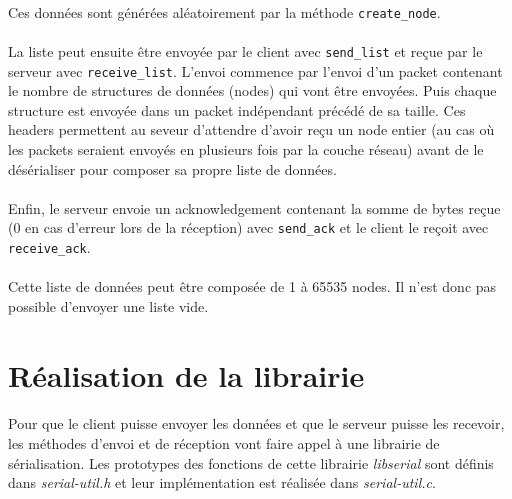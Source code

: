 \documentclass{article}
\begin{document}
    \newpage
    \paragraph{}
    Ces données sont générées aléatoirement par la méthode \texttt{create\_node}.

    \paragraph{}
    La liste peut ensuite être envoyée par le client avec \texttt{send\_list} et reçue par le serveur avec \texttt{receive\_list}. L'envoi commence par l'envoi d'un packet contenant le nombre de structures de données (nodes) qui vont être envoyées. Puis chaque structure est envoyée dans un packet indépendant précédé de sa taille. Ces headers permettent au seveur d'attendre d'avoir reçu un node entier (au cas où les packets seraient envoyés en plusieurs fois par la couche réseau) avant de le désérialiser pour composer sa propre liste de données.

    \paragraph{}
    Enfin, le serveur envoie un acknowledgement contenant la somme de bytes reçue (0 en cas d'erreur lors de la réception) avec \texttt{send\_ack} et le client le reçoit avec \texttt{receive\_ack}.

    \paragraph{}
    Cette liste de données peut être composée de 1 à 65535 nodes. Il n'est donc pas possible d'envoyer une liste vide.


    \section{Réalisation de la librairie}
    \paragraph{}
    Pour que le client puisse envoyer les données et que le serveur puisse les recevoir, les méthodes d'envoi et de réception vont faire appel à une librairie de sérialisation. Les prototypes des fonctions de cette librairie \emph{libserial} sont définis dans \emph{serial-util.h} et leur implémentation est réalisée dans \emph{serial-util.c}.
\end{document}
